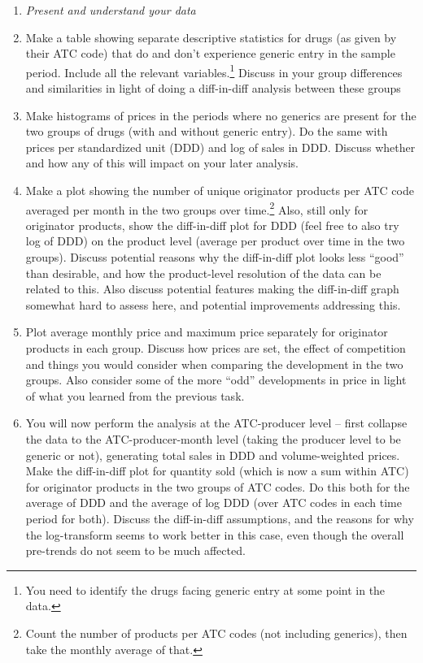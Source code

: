 \documentclass[12pt,a4paper]{article}
\begin{document}
\begin{enumerate}
 \item[] \emph{Present and understand your data}
 \item Make a table showing separate descriptive statistics for drugs (as given by their ATC code) that do and don't experience generic entry in the sample period. Include all the relevant variables.\footnote{You need to identify the drugs facing generic entry at some point in the data.} Discuss in your group differences and similarities in light of doing a diff-in-diff analysis between these groups
 \item Make histograms of prices in the periods where no generics are present for the two groups of drugs (with and without generic entry). Do the same with prices per standardized unit (DDD) and log of sales in DDD. Discuss whether and how any of this will impact on your later analysis.
 \item Make a plot showing the number of unique originator products per ATC code averaged per month in the two groups over time.\footnote{Count the number of products per ATC codes (not including generics), then take the monthly average of that.} Also, still only for originator products, show the diff-in-diff plot for DDD (feel free to also try log of DDD) on the product level (average per product over time in the two groups). Discuss potential reasons why the diff-in-diff plot looks less ``good'' than desirable, and how the product-level resolution of the data can be related to this. Also discuss potential features making the diff-in-diff graph somewhat hard to assess here, and potential improvements addressing this.
 \item Plot average monthly price and maximum price separately for originator products in each group. Discuss how prices are set, the effect of competition and things you would consider when comparing the development in the two groups. Also consider some of the more ``odd'' developments in price in light of what you learned from the previous task.
 \item You will now perform the analysis at the ATC-producer level -- first collapse the data to the ATC-producer-month level (taking the producer level to be generic or not), generating total sales in DDD and volume-weighted prices. Make the diff-in-diff plot for quantity sold (which is now a sum within ATC) for originator products in the two groups of ATC codes. Do this both for the average of DDD and the average of log DDD (over ATC codes in each time period for both). Discuss the diff-in-diff assumptions, and the reasons for why the log-transform seems to work better in this case, even though the overall pre-trends do not seem to be much affected.

\end{enumerate}
\end{document}
